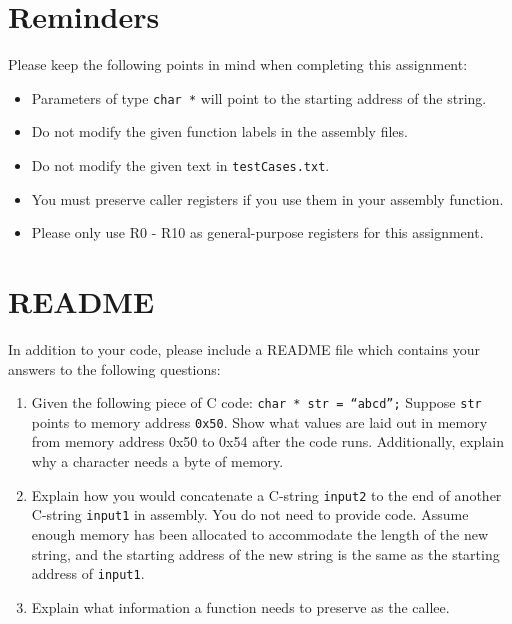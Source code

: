 \documentclass{article}
\begin{document}
\section{Reminders}
Please keep the following points in mind when completing this assignment:
\begin{itemize}
    \item Parameters of type {\tt char *} will point to the starting address of the string.
    \item Do not modify the given function labels in the assembly files.
    \item Do not modify the given text in {\tt testCases.txt}.
    \item You must preserve caller registers if you use them in your assembly function.
    \item Please only use R0 - R10 as general-purpose registers for this assignment.
    
\end{itemize}

\section{README}

In addition to your code, please include a README file which contains your
answers to the following questions:

\begin{enumerate}

\item Given the following piece of C code: {\tt char * str = ``abcd'';} \newline Suppose {\tt str} points to memory address {\tt 0x50}. Show what values are laid out in memory from memory address 0x50 to 0x54 after the code runs. Additionally, explain why a character needs a byte of memory.

\item Explain how you would concatenate a C-string {\tt input2} to the end of another C-string {\tt input1} in assembly. You do not need to provide code. Assume enough memory has been allocated to accommodate the length of the new string, and the starting address of the new string is the same as the starting address of {\tt input1}.

\item Explain what information a function needs to preserve as the callee.  

\end{enumerate}
\end{document}

